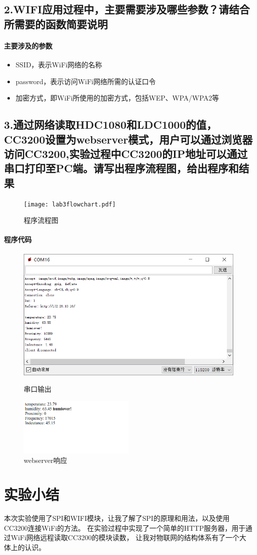 \documentclass[a4paper]{ctexart}
\begin{document}
    \subsection*{2.WIFI应用过程中，主要需要涉及哪些参数？请结合所需要的函数简要说明}
    \paragraph*{主要涉及的参数}
    \begin{itemize}
      \item SSID，表示WiFi网络的名称
      \item password，表示访问WiFi网络所需的认证口令
      \item 加密方式，即WiFi所使用的加密方式，包括WEP、WPA/WPA2等
    \end{itemize}
    \newpage
    \subsection*{3.通过网络读取HDC1080和LDC1000的值，CC3200设置为webserver模式，用户可以通过浏览器
    访问CC3200,实验过程中CC3200的IP地址可以通过串口打印至PC端。请写出程序流程图，给出程序和结果}

    \begin{figure}[H]
      \texttt{[image: lab3flowchart.pdf]}
      \caption{程序流程图}
    \end{figure}

    \paragraph*{程序代码\\}
    

    \begin{figure}[H]
      \includegraphics*[width=1.0\textwidth]{res_uart.png}
      \caption{串口输出}
      \includegraphics*[width=0.5\textwidth]{res_http.png}
      \caption{webserver响应}
    \end{figure}

  \section{实验小结}
  本次实验使用了SPI和WIFI模块，让我了解了SPI的原理和用法，以及使用CC3200连接WiFi的方法。
  在实验过程中实现了一个简单的HTTP服务器，用于通过WiFi网络远程读取CC3200的模块读数，
  让我对物联网的结构体系有了一个大体上的认识。
\end{document}
